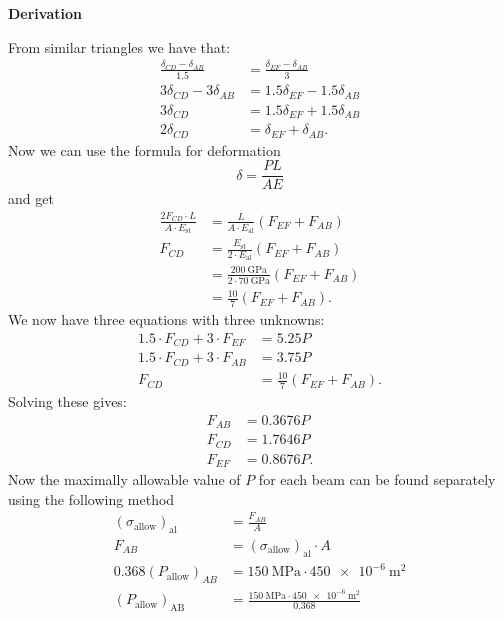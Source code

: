 \documentclass[a4paper]{article}
\numberwithin{equation}{problem}
\newcommand{\AUheading}[1]{%
  \par\vspace{.4\baselineskip}%
  {\sffamily\bfseries\color{AUblueDark}#1\par}%
  \nobreak%
}
\newenvironment{derivation}[1][Derivation]{%
  \AUheading{#1}
  \begingroup\allowdisplaybreaks
  \setlength{\abovedisplayskip}{6pt}%
  \setlength{\belowdisplayskip}{6pt}%
  \setlength{\abovedisplayshortskip}{4pt}%
  \setlength{\belowdisplayshortskip}{4pt}%
}{\par\endgroup\medskip}
\begin{document}
\begin{derivation}
  From similar triangles we have that:
  \begin{align*}
    \frac{\delta_{CD} - \delta_{AB}}{\num{1,5}} &= \frac{\delta_{EF} - \delta_{AB}}{3} \\
    3 \delta_{CD} - 3 \delta_{AB} &= \num{1,5} \delta_{EF} - \num{1,5} \delta_{AB} \\
    3 \delta_{CD} &= \num{1,5} \delta_{EF} + \num{1,5} \delta_{AB} \\
    2 \delta_{CD} &= \delta_{EF} + \delta_{AB}
  .\end{align*}
  Now we can use the formula for deformation
  \[ 
  \delta = \frac{PL}{AE}
  \]
  and get
  \begin{align*}
    \frac{2 F_{CD} \cdot L}{A \cdot E_{\mathrm{st}}} &= \frac{L}{A \cdot E_{\mathrm{al}}} \left( F_{EF} + F_{AB} \right) \\
    F_{CD} &= \frac{E_{\mathrm{st}}}{2 \cdot E_{\mathrm{al}}} \left( F_{EF} + F_{AB} \right) \\
           &= \frac{\qty{200}{\GPa}}{2 \cdot \qty{70}{\GPa}} \left( F_{EF} + F_{AB} \right) \\
           &= \frac{10}{7} \left( F_{EF} + F_{AB} \right)
  .\end{align*}
  We now have three equations with three unknowns:
  \begin{align*}
    \num{1,5} \cdot F_{CD} + 3 \cdot F_{EF} &= \num{5,25} P \\
    \num{1,5} \cdot F_{CD} + 3 \cdot F_{AB} &= \num{3,75} P \\
    F_{CD} &= \frac{10}{7} \left( F_{EF} + F_{AB} \right)
  .\end{align*}
  Solving these gives:
  \begin{align*}
    F_{AB} &= \num{0,3676} P \\
    F_{CD} &= \num{1,7646} P \\
    F_{EF} &= \num{0,8676} P
  .\end{align*}
  Now the maximally allowable value of $P$ for each beam can be found separately using the following method
  \begin{align*}
    \left( \sigma_{\text{allow}} \right)_{\mathrm{al}} &= \frac{F_{AB}}{A} \\
    F_{AB} &= \left( \sigma_{\text{allow}} \right)_{\mathrm{al}} \cdot A \\
    \num{0,368} \left( P_{\text{allow}} \right)_{AB} &= \qty{150}{\MPa} \cdot \qty{450e-6}{\m\squared}  \\
    \left( P_{\text{allow}} \right)_{\mathrm{AB}} &= \frac{\qty{150}{\MPa} \cdot \qty{450e-6}{\m\squared} }{\num{0,368}} \\

\end{align*}
\end{derivation}
\end{document}
